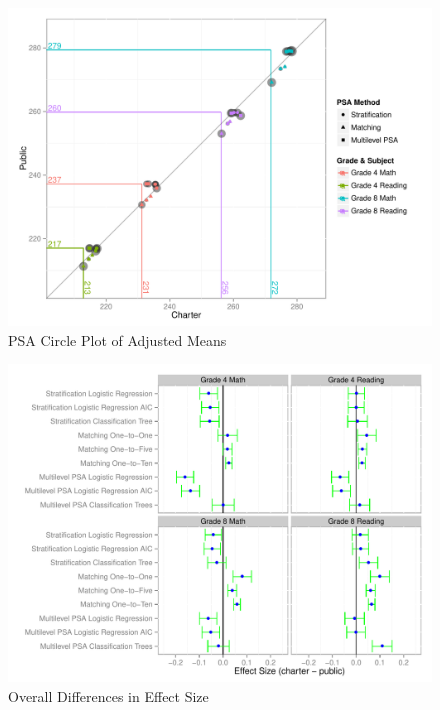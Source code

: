 \documentclass[letterpaper,12p,twoside]{article} %
\begin{document}
\begin{figure}[ht]
\begin{center}
\includegraphics[width=\textwidth]{../Figures2009/OverallScatter.pdf}
\caption{PSA Circle Plot of Adjusted Means}
\label{fig:overallcirc}
\end{center}
\end{figure}



\begin{figure}[ht]
\begin{center}
\includegraphics[width=\textwidth]{../Figures2009/Overall.pdf}
\caption{Overall Differences in Effect Size}
\label{fig:overalldiff}
\end{center}
\end{figure}
\end{document}
